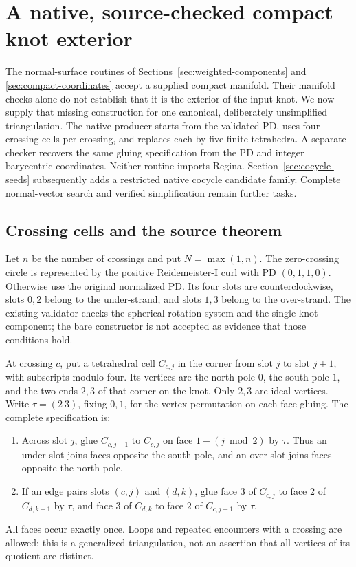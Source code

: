 \section{A native, source-checked compact knot exterior}
\label{sec:diagram-exterior}

The normal-surface routines of Sections~\ref{sec:weighted-components} and
\ref{sec:compact-coordinates} accept a supplied compact manifold. Their
manifold checks alone do not establish that it is the exterior of the input
knot. We now supply that missing construction for one canonical, deliberately
unsimplified triangulation. The native producer starts from the validated PD,
uses four crossing cells per crossing, and replaces each by five finite
tetrahedra. A separate checker recovers the same gluing specification from
the PD and integer barycentric coordinates. Neither routine imports Regina.
Section~\ref{sec:cocycle-seeds} subsequently adds a restricted native
cocycle candidate family. Complete normal-vector search and verified
simplification remain further tasks.

\subsection{Crossing cells and the source theorem}

Let $n$ be the number of crossings and put $N=\max(1,n)$. The zero-crossing
circle is represented by the positive Reidemeister-I curl with PD
$(0,1,1,0)$. Otherwise use the original normalized PD. Its four slots are
counterclockwise, slots $0,2$ belong to the under-strand, and slots $1,3$
belong to the over-strand. The existing validator checks the spherical
rotation system and the single knot component; the bare 
constructor is not accepted as evidence that those conditions hold.

At crossing $c$, put a tetrahedral cell $C_{c,j}$ in the corner from slot $j$
to slot $j+1$, with subscripts modulo four. Its vertices are the north pole
$0$, the south pole $1$, and the two ends $2,3$ of that corner on the knot.
Only $2,3$ are ideal vertices. Write $\tau=(2\ 3)$, fixing $0,1$, for the
vertex permutation on each face gluing. The complete specification is:
\begin{enumerate}
\item Across slot $j$, glue $C_{c,j-1}$ to $C_{c,j}$ on face
  $1-(j\bmod2)$ by $\tau$. Thus an under-slot joins faces opposite the
  south pole, and an over-slot joins faces opposite the north pole.
\item If an edge pairs slots $(c,j)$ and $(d,k)$, glue face $3$ of
  $C_{c,j}$ to face $2$ of $C_{d,k-1}$ by $\tau$, and face $3$ of
  $C_{d,k}$ to face $2$ of $C_{c,j-1}$ by $\tau$.
\end{enumerate}
All faces occur exactly once. Loops and repeated encounters with a crossing
are allowed: this is a generalized triangulation, not an assertion that all
vertices of its quotient are distinct.

